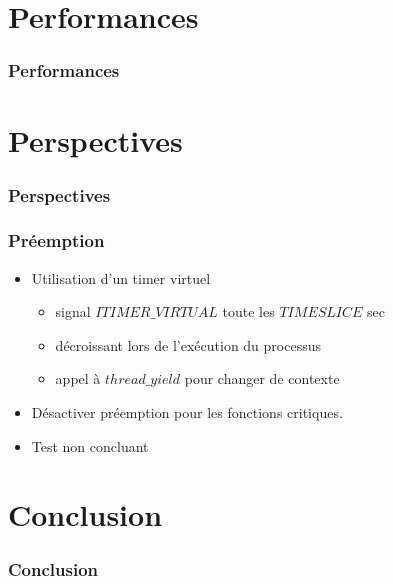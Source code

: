 \documentclass{beamer}
\begin{document}
\section{Performances}

\begin{frame}
  \frametitle{Performances}
\end{frame}

\section{Perspectives}

\begin{frame}
  \frametitle{Perspectives}
\end{frame}

\begin{frame}
  \frametitle{Préemption}
  \begin{itemize}
    \item Utilisation d'un timer virtuel
      \begin{itemize}
      \item signal $ITIMER\_VIRTUAL$ toute les $TIMESLICE$ sec
      \item décroissant lors de l'exécution du processus
      \item appel à $thread\_yield$ pour changer de contexte
      \end{itemize}
    \item Désactiver préemption pour les fonctions critiques.
    \item Test non concluant
  \end{itemize}
\end{frame}

\section{Conclusion}

\begin{frame}
  \frametitle{Conclusion}
\end{frame}


 
\end{document}
